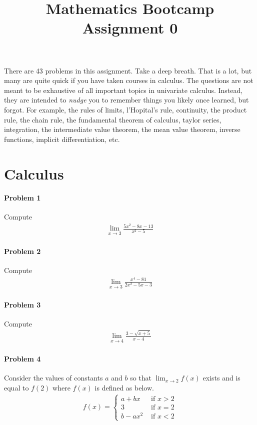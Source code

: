 \documentclass[a4paper, 11pt]{article}
\title{ Mathematics Bootcamp Assignment 0 }
\begin{document}
\maketitle

There are 43 problems in this assignment.
Take a deep breath.
That is a lot, but many are quite quick if you have taken courses in calculus. The questions are not meant to be exhaustive of all important topics in univariate calculus.
Instead, they are intended to \emph{nudge} you to remember things you likely once learned, but forgot.
For example, the rules of limits, l'Hopital's rule, continuity, the product rule, the chain rule, the fundamental theorem of calculus, taylor series, integration, the intermediate value theorem, the mean value theorem, inverse functions, implicit differentiation, etc.

\section{Calculus}

\paragraph{Problem 1} Compute
\begin{align}
    \lim_{x\rightarrow 3} \frac{5x^2 - 8x -13}{x^2-5}  \nonumber
\end{align}

\paragraph{Problem 2} Compute
\begin{align}
    \lim_{x\rightarrow 3} \frac{x^4 - 81}{2x^2-5x-3}  \nonumber
\end{align}

\paragraph{Problem 3}
Compute
\begin{align}
    \lim_{x\rightarrow 4} \frac{3-\sqrt{x+5}}{x-4}  \nonumber
\end{align}

\paragraph{Problem 4}
Consider the values of constants $a$ and $b$ so that $\lim_{x \rightarrow 2} f(x)$ exists and is equal to $f(2)$ where $f(x)$ is defined as below.
\begin{align}
    f(x) = \begin{cases}
    			a + bx & \text{ if } x > 2 \\
    			3 & \text{ if } x=2 \\
    			b-ax^2 & \text{ if } x < 2
    	   \end{cases}  \nonumber
\end{align}
\end{document}
